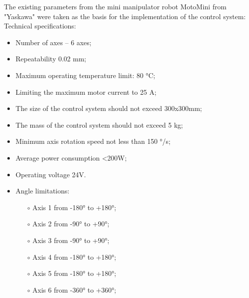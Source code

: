 The existing parameters from the mini manipulator robot MotoMini from "Yaskawa" were taken as the basis for the implementation of the control system:
Technical specifications:
\begin{itemize}
	\item Number of axes – 6 axes;
	\item Repeatability 0.02 mm;
	\item Maximum operating temperature limit: 80 °C;
	\item Limiting the maximum motor current to 25 A;
	\item The size of the control system should not exceed 300x300mm;
	\item The mass of the control system should not exceed 5 kg;
	\item Minimum axis rotation speed not less than 150 °/s;
	\item Average power consumption <200W;
	\item Operating voltage 24V.
	\item Angle limitations:
	      \begin{itemize}
		      \item[$\circ$] Axis 1 from -180° to +180°;
		      \item[$\circ$] Axis 2 from -90° to +90°;
		      \item[$\circ$] Axis 3 from -90° to +90°;
		      \item[$\circ$] Axis 4 from -180° to +180°;
		      \item[$\circ$] Axis 5 from -180° to +180°;
		      \item[$\circ$] Axis 6 from -360° to +360°;
	      \end{itemize}
\end{itemize}